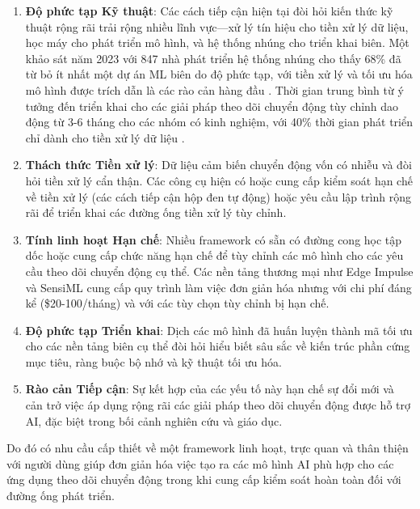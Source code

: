 \begin{enumerate}
\item \textbf{Độ phức tạp Kỹ thuật}: Các cách tiếp cận hiện tại đòi hỏi kiến thức kỹ thuật rộng rãi trải rộng nhiều lĩnh vực—xử lý tín hiệu cho tiền xử lý dữ liệu, học máy cho phát triển mô hình, và hệ thống nhúng cho triển khai biên. Một khảo sát năm 2023 với 847 nhà phát triển hệ thống nhúng cho thấy 68\% đã từ bỏ ít nhất một dự án ML biên do độ phức tạp, với tiền xử lý và tối ưu hóa mô hình được trích dẫn là các rào cản hàng đầu \cite{merenda2020edge}. Thời gian trung bình từ ý tưởng đến triển khai cho các giải pháp theo dõi chuyển động tùy chỉnh dao động từ 3-6 tháng cho các nhóm có kinh nghiệm, với 40\% thời gian phát triển chỉ dành cho tiền xử lý dữ liệu \cite{warden2019tinyml}.

\item \textbf{Thách thức Tiền xử lý}: Dữ liệu cảm biến chuyển động vốn có nhiễu và đòi hỏi tiền xử lý cẩn thận. Các công cụ hiện có hoặc cung cấp kiểm soát hạn chế về tiền xử lý (các cách tiếp cận hộp đen tự động) hoặc yêu cầu lập trình rộng rãi để triển khai các đường ống tiền xử lý tùy chỉnh.

\item \textbf{Tính linh hoạt Hạn chế}: Nhiều framework có sẵn có đường cong học tập dốc hoặc cung cấp chức năng hạn chế để tùy chỉnh các mô hình cho các yêu cầu theo dõi chuyển động cụ thể. Các nền tảng thương mại như Edge Impulse và SensiML cung cấp quy trình làm việc đơn giản hóa nhưng với chi phí đáng kể (\$20-100/tháng) và với các tùy chọn tùy chỉnh bị hạn chế.

\item \textbf{Độ phức tạp Triển khai}: Dịch các mô hình đã huấn luyện thành mã tối ưu cho các nền tảng biên cụ thể đòi hỏi hiểu biết sâu sắc về kiến trúc phần cứng mục tiêu, ràng buộc bộ nhớ và kỹ thuật tối ưu hóa.

\item \textbf{Rào cản Tiếp cận}: Sự kết hợp của các yếu tố này hạn chế sự đổi mới và cản trở việc áp dụng rộng rãi các giải pháp theo dõi chuyển động được hỗ trợ AI, đặc biệt trong bối cảnh nghiên cứu và giáo dục.
\end{enumerate}

Do đó có nhu cầu cấp thiết về một framework linh hoạt, trực quan và thân thiện với người dùng giúp đơn giản hóa việc tạo ra các mô hình AI phù hợp cho các ứng dụng theo dõi chuyển động trong khi cung cấp kiểm soát hoàn toàn đối với đường ống phát triển.

